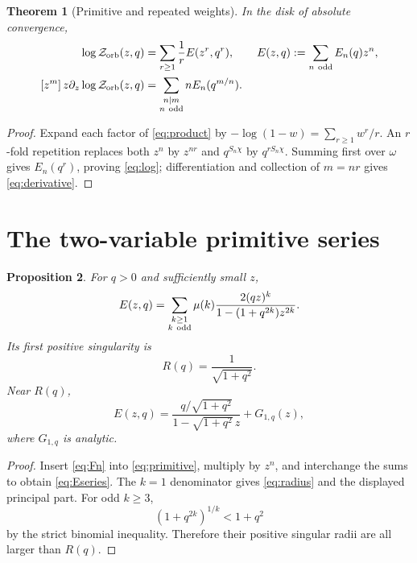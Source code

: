 \documentclass[11pt]{article}
\newtheorem{theorem}{Theorem}[section]
\newtheorem{proposition}[theorem]{Proposition}
\newcommand{\Zorb}{\mathcal Z_{\rm orb}}
\begin{document}
\begin{theorem}[Primitive and repeated weights]\label{thm:ledger}
In the disk of absolute convergence,
\begin{align}
 \log\Zorb(z,q)&=\sum_{r\ge1}\frac1r E(z^r,q^r),
 \qquad E(z,q):=\sum_{n\ {\rm odd}}E_n(q)z^n,\label{eq:log}\\
 [z^m]\,z\partial_z\log\Zorb(z,q)
 &=\sum_{\substack{n\mid m\\n\ {\rm odd}}}
 nE_n(q^{m/n}).\label{eq:derivative}
\end{align}
\end{theorem}

\begin{proof}
Expand each factor of \eqref{eq:product} by
$-\log(1-w)=\sum_{r\ge1}w^r/r$.  An $r$-fold repetition replaces both
$z^n$ by $z^{nr}$ and $q^{S_n\chi}$ by $q^{rS_n\chi}$.  Summing first over
$\omega$ gives $E_n(q^r)$, proving \eqref{eq:log}; differentiation and
collection of $m=nr$ gives \eqref{eq:derivative}.
\end{proof}

\section{The two-variable primitive series}

\begin{proposition}\label{prop:primitive-series}
For $q>0$ and sufficiently small $z$,
\begin{equation}\label{eq:Eseries}
 E(z,q)=\sum_{\substack{k\ge1\\k\ {\rm odd}}}
 \mu(k)\frac{2(qz)^k}
 {1-(1+q^{2k})z^{2k}}.
\end{equation}
Its first positive singularity is
\begin{equation}\label{eq:radius}
 R(q)=\frac1{\sqrt{1+q^2}}.
\end{equation}
Near $R(q)$,
\begin{equation}\label{eq:Eprincipal}
 E(z,q)=
 \frac{q/\sqrt{1+q^2}}{1-\sqrt{1+q^2}\,z}+G_{1,q}(z),
\end{equation}
where $G_{1,q}$ is analytic.
\end{proposition}

\begin{proof}
Insert \eqref{eq:Fn} into \eqref{eq:primitive}, multiply by $z^n$, and
interchange the sums to obtain \eqref{eq:Eseries}.  The $k=1$ denominator
gives \eqref{eq:radius} and the displayed principal part.  For odd $k\ge3$,
\[
 (1+q^{2k})^{1/k}<1+q^2
\]
by the strict binomial inequality.  Therefore their positive singular radii
are all larger than $R(q)$.
\end{proof}
\end{document}
